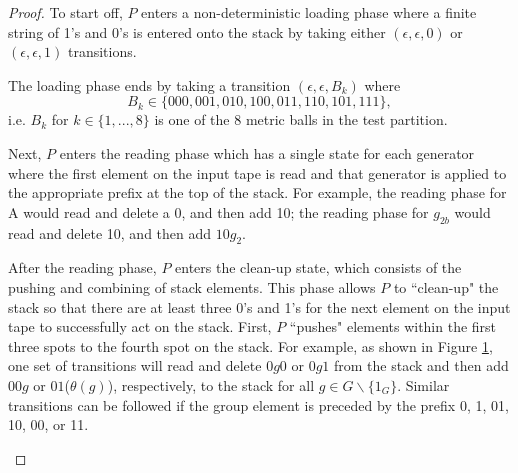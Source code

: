 \documentclass[11pt]{amsart}
\theoremstyle{plain}
\theoremstyle{remark}
\theoremstyle{definition}
\theoremstyle{remark}
\theoremstyle{named}
\begin{document}
\begin{proof}
To start off, $P$ enters a non-deterministic loading phase where a finite string of 1's and 0's is entered onto the stack by taking either $(\epsilon, \epsilon, 0)$ or $(\epsilon, \epsilon, 1)$ transitions. 

The loading phase ends by taking a transition $(\epsilon, \epsilon, B_k)$ where
\[B_k \in \{000, 001, 010, 100, 011, 110, 101, 111\},\] 
i.e. $B_k$ for $k\in\{1,...,8\}$ is one of the 8 metric balls in the test partition. 

Next, $P$ enters the reading phase which has a single state for each generator where the first element on the input tape is read and that generator is applied to the appropriate prefix at the top of the stack. 
For example, the reading phase for A would read and delete a 0, and then add 10; the reading phase for $g_{2b}$ would read and delete 10, and then add $10g_2$.

After the reading phase, $P$ enters the clean-up state, which consists of the pushing and combining of stack elements. This phase allows $P$ to ``clean-up" the stack so that there are at least three 0's and 1's for the next element on the input tape to successfully act on the stack. First, $P$ ``pushes" elements within the first three spots to the fourth spot on the stack. For example, as shown in Figure \ref{cleanup}, one set of transitions will read and delete $0g0$ or $0g1$ from the stack and then add $00g$ or $01$($\theta(g)$), respectively, to the stack for all $g \in G \backslash \{ 1_G \}$. Similar transitions can be followed if the group element is preceded by the prefix 0, 1, 01, 10, 00, or 11. 

\begin{figure}[ht]
\label{cleanup}
\end{figure}



\end{proof}
\end{document}
